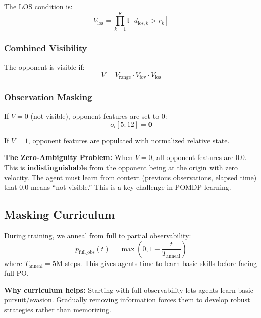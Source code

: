 \documentclass[11pt,a4paper]{report}
\begin{document}
The LOS condition is:
\begin{equation}
    V_{\text{los}} = \prod_{k=1}^{K} \mathbb{I}[d_{\text{los},k} > r_k]
\end{equation}

\subsubsection{Combined Visibility}

The opponent is visible if:
\begin{equation}
    V = V_{\text{range}} \cdot V_{\text{fov}} \cdot V_{\text{los}}
\end{equation}

\subsubsection{Observation Masking}

If $V = 0$ (not visible), opponent features are set to 0:
\begin{equation}
    o_i[5:12] = \mathbf{0}
\end{equation}

If $V = 1$, opponent features are populated with normalized relative state.

\begin{warningbox}
\textbf{The Zero-Ambiguity Problem:} When $V = 0$, all opponent features are 0.0. This is \textbf{indistinguishable} from the opponent being at the origin with zero velocity. The agent must learn from context (previous observations, elapsed time) that 0.0 means ``not visible.'' This is a key challenge in POMDP learning.
\end{warningbox}

\subsection{Masking Curriculum}
During training, we anneal from full to partial observability:
\begin{equation}
    p_{\text{full\_obs}}(t) = \max\left(0, 1 - \frac{t}{T_{\text{anneal}}}\right)
\end{equation}
where $T_{\text{anneal}} = 5\text{M}$ steps. This gives agents time to learn basic skills before facing full PO.

\begin{infobox}
\textbf{Why curriculum helps:} Starting with full observability lets agents learn basic pursuit/evasion. Gradually removing information forces them to develop robust strategies rather than memorizing.
\end{infobox}
\end{document}
